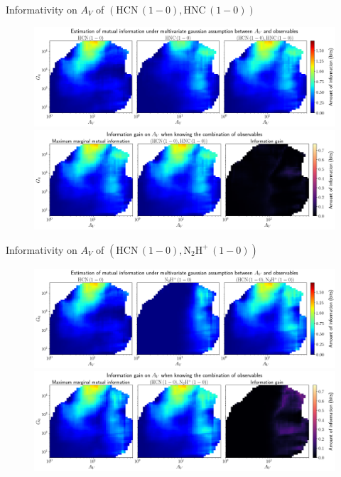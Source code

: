 \documentclass{beamer}
\begin{document}
\begin{frame}{Informativity on $A_V$ of $\left(\mathrm{HCN\,(1-0)},\mathrm{HNC\,(1-0)}\right)$}
    \begin{figure}
        \centering
        \includegraphics[width=0.95\linewidth]{../linearinfogauss/av__hcn10_hnc10_linearinfogauss.png}
        \vfill
        \includegraphics[width=0.95\linewidth]{../linearinfogauss/av__hcn10_hnc10_linearinfogauss_gain.png}
    \end{figure}
\end{frame}

\begin{frame}{Informativity on $A_V$ of $\left(\mathrm{HCN\,(1-0)},\mathrm{N_2H^+\,(1-0)}\right)$}
    \begin{figure}
        \centering
        \includegraphics[width=0.95\linewidth]{../linearinfogauss/av__hcn10_n2hp10_linearinfogauss.png}
        \vfill
        \includegraphics[width=0.95\linewidth]{../linearinfogauss/av__hcn10_n2hp10_linearinfogauss_gain.png}
    \end{figure}
\end{frame}
\end{document}
